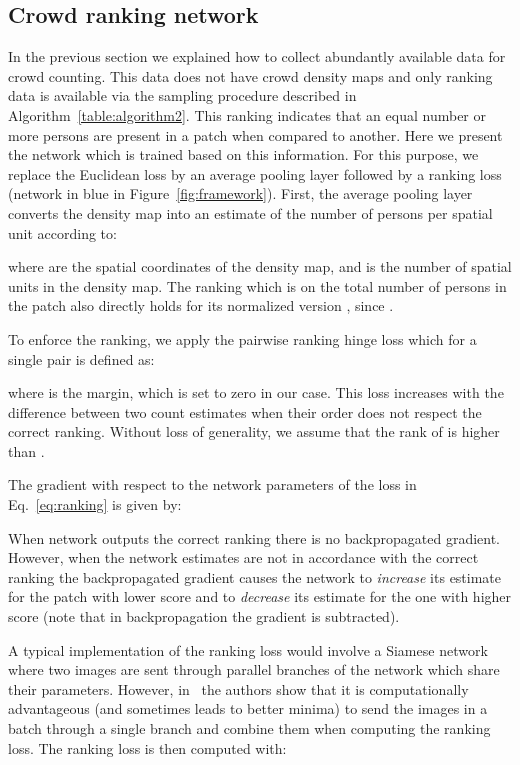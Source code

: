 \documentclass[10pt,twocolumn,letterpaper]{article}
\begin{document}
\subsection{Crowd ranking network}
In the previous section we explained how to collect abundantly
available data for crowd counting. This data does not have crowd
density maps and only ranking data is available via the sampling
procedure described in Algorithm~\ref{table:algorithm2}. This ranking
indicates that an equal number or more persons are
present in a patch when compared to another. Here we present the
network which is trained based on this information.
For this purpose, we replace the Euclidean loss by an average pooling
layer followed by a ranking loss (network in blue in
Figure~\ref{fig:framework}). First, the average pooling layer converts
the density map into an estimate of the number of persons per spatial
unit  according to:

where  are the spatial coordinates of the density map, and
 is the number of spatial units in the density map. The
ranking which is on the total number of persons in the patch
 also directly holds for its normalized version ,
since .

To enforce the ranking, we apply the pairwise ranking hinge loss which
for a single pair is defined as:

where  is the margin, which is set to zero in our
case. This loss increases with the difference between two count
estimates when their order does not respect the correct
ranking. Without loss of generality, we assume that the rank of  is higher than .

The gradient with respect to the network parameters  of the
loss in Eq.~\ref{eq:ranking} is given by:

When network outputs the correct ranking there is no backpropagated
gradient. However, when the network estimates are not in accordance
with the correct ranking the backpropagated gradient causes the
network to \emph{increase} its estimate for the patch with lower score
and to \emph{decrease} its estimate for the one with higher score
(note that in backpropagation the gradient is subtracted).


A typical implementation of the ranking loss would involve a Siamese network~\cite{chopra2005learning} where two images are sent through parallel branches of the network which share their parameters. However, in~\cite{liu2017rankiqa} the authors show that it is computationally advantageous (and sometimes leads to better minima) to send the images in a batch through a single branch and combine them when computing the ranking loss. The ranking loss is then computed with:
\end{document}
